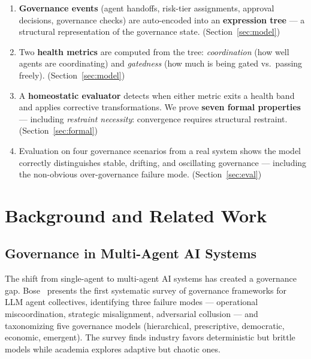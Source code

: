\documentclass[sigconf,nonacm]{acmart}
\begin{document}
\begin{enumerate}[leftmargin=*]
  \item \textbf{Governance events} (agent handoffs, risk-tier assignments,
    approval decisions, governance checks) are auto-encoded into an
    \textbf{expression tree} --- a structural representation of the
    governance state. (Section~\ref{sec:model})

  \item Two \textbf{health metrics} are computed from the tree:
    \emph{coordination} (how well agents are coordinating) and
    \emph{gatedness} (how much is being gated vs.\ passing freely).
    (Section~\ref{sec:model})

  \item A \textbf{homeostatic evaluator} detects when either metric exits a
    health band and applies corrective transformations. We prove
    \textbf{seven formal properties} --- including
    \emph{restraint necessity}: convergence requires structural
    restraint. (Section~\ref{sec:formal})

  \item Evaluation on four governance scenarios from a real system shows the
    model correctly distinguishes stable, drifting, and oscillating
    governance --- including the non-obvious over-governance failure mode.
    (Section~\ref{sec:eval})
\end{enumerate}

\section{Background and Related Work}

\subsection{Governance in Multi-Agent AI Systems}

The shift from single-agent to multi-agent AI systems has created a
governance gap. Bose~\cite{bose} presents the first systematic survey of
governance frameworks for LLM agent collectives, identifying three
failure modes --- operational miscoordination, strategic misalignment,
adversarial collusion --- and taxonomizing five governance models
(hierarchical, prescriptive, democratic, economic, emergent). The
survey finds industry favors deterministic but brittle models while
academia explores adaptive but chaotic ones.
\end{document}
